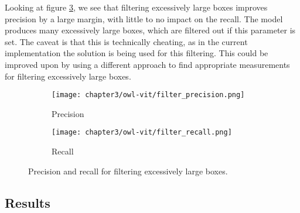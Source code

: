 Looking at figure \ref{fig:3_filter}, we see that filtering excessively large boxes improves precision by a large margin, with little to no impact on the recall. The model produces many excessively large boxes, which are filtered out if this parameter is set. The caveat is that this is technically cheating, as in the current implementation the solution is being used for this filtering. This could be improved upon by using a different approach to find appropriate measurements for filtering excessively large boxes.

\begin{figure}[h]
    \begin{adjustwidth}{-1in}{-1in}
        \centering
        \begin{subfigure}[b]{0.45\paperwidth}
            \texttt{[image: chapter3/owl-vit/filter\_precision.png]}
            \caption{Precision}
            \label{fig:3_filter_precision}
        \end{subfigure}
        \begin{subfigure}[b]{0.45\paperwidth}
            \texttt{[image: chapter3/owl-vit/filter\_recall.png]}
            \caption{Recall}
            \label{fig:3_filter_recall}
        \end{subfigure}
    \end{adjustwidth}
    \caption{Precision and recall for filtering excessively large boxes.}
    \label{fig:3_filter}
\end{figure}

\subsection{Results}
